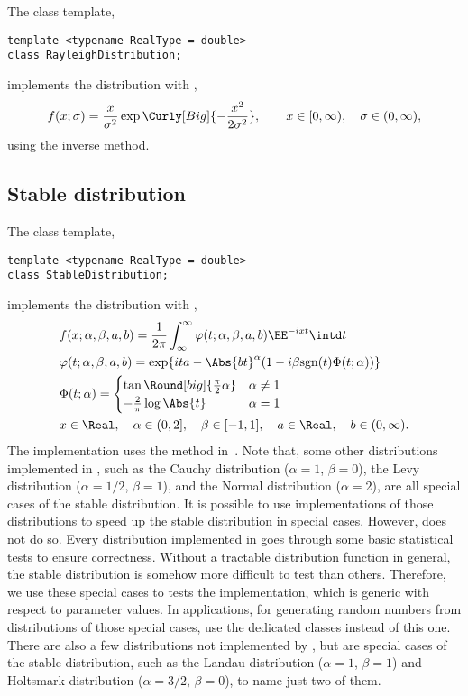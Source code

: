 The class template,
\begin{verbatim}
template <typename RealType = double>
class RayleighDistribution;
\end{verbatim}
implements the distribution with \pdf,
\begin{equation*}
  f(x;\sigma) =
  \frac{x}{\sigma^2}\exp\Curly[Big]{-\frac{x^2}{2\sigma^2}},\qquad
  x \in [0, \infty),\quad \sigma \in (0, \infty),
\end{equation*}
using the inverse method.

\subsection{Stable distribution}
\label{sub:Stable distribution}

The class template,
\begin{verbatim}
template <typename RealType = double>
class StableDistribution;
\end{verbatim}
implements the distribution with \pdf,
\begin{align*}
  &f(x;\alpha,\beta,a,b) =
  \frac{1}{2\pi}\int_{\infty}^{\infty}
  \varphi(t;\alpha,\beta,a,b)\EE^{-ixt}\intd t\\
  &\varphi(t;\alpha,\beta,a,b) =
  \exp\{ita - \Abs{bt}^{\alpha}(1 - i\beta\mathrm{sgn}(t)\Phi(t;\alpha))\} \\
  &\Phi(t;\alpha) = \begin{cases}
    \tan\Round[big]{\frac{\pi}{2}\alpha} & \alpha \ne 1 \\
    -\frac{2}{\pi}\log\Abs{t}            & \alpha = 1
  \end{cases} \\
  & x \in \Real,\quad
  \alpha \in (0, 2],\quad \beta \in [-1, 1],\quad
  a \in \Real,\quad b \in (0, \infty).
\end{align*}
The implementation uses the method in~\cite{Chambers:1976dv}. Note that, some
other distributions implemented in \mckl, such as the Cauchy distribution
($\alpha = 1$, $\beta = 0$), the Levy distribution ($\alpha = 1/2$, $\beta =
1$), and the Normal distribution ($\alpha = 2$), are all special cases of the
stable distribution. It is possible to use implementations of those
distributions to speed up the stable distribution in special cases. However,
\mckl does not do so. Every distribution implemented in \mckl goes through some
basic statistical tests to ensure correctness. Without a tractable distribution
function in general, the stable distribution is somehow more difficult to test
than others. Therefore, we use these special cases to tests the implementation,
which is generic with respect to parameter values. In applications, for
generating random numbers from distributions of those special cases, use the
dedicated classes instead of this one. There are also a few distributions not
implemented by \mckl, but are special cases of the stable distribution, such as
the Landau distribution ($\alpha = 1$, $\beta = 1$) and Holtsmark distribution
($\alpha = 3/2$, $\beta = 0$), to name just two of them.

